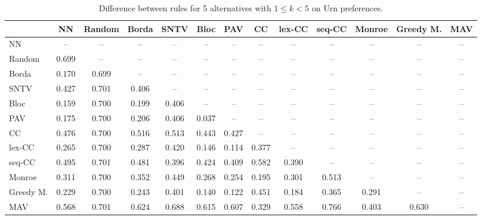 
\begin{table*}[htbp]
\centering
\begin{tabular}{lcccccccccccc}
\toprule
 & NN & Random & Borda & SNTV & Bloc & PAV & CC & lex-CC & seq-CC & Monroe & Greedy M. & MAV \\
\midrule
NN & -- & -- & -- & -- & -- & -- & -- & -- & -- & -- & -- & -- \\
Random & \cellcolor{blue!69} 0.699 & -- & -- & -- & -- & -- & -- & -- & -- & -- & -- & -- \\
Borda & \cellcolor{blue!17} 0.170 & \cellcolor{blue!69} 0.699 & -- & -- & -- & -- & -- & -- & -- & -- & -- & -- \\
SNTV & \cellcolor{blue!42} 0.427 & \cellcolor{blue!70} 0.701 & \cellcolor{blue!40} 0.406 & -- & -- & -- & -- & -- & -- & -- & -- & -- \\
Bloc & \cellcolor{blue!15} 0.159 & \cellcolor{blue!70} 0.700 & \cellcolor{blue!19} 0.199 & \cellcolor{blue!40} 0.406 & -- & -- & -- & -- & -- & -- & -- & -- \\
PAV & \cellcolor{blue!17} 0.175 & \cellcolor{blue!70} 0.700 & \cellcolor{blue!20} 0.206 & \cellcolor{blue!40} 0.406 & \cellcolor{blue!3} 0.037 & -- & -- & -- & -- & -- & -- & -- \\
CC & \cellcolor{blue!47} 0.476 & \cellcolor{blue!70} 0.700 & \cellcolor{blue!51} 0.516 & \cellcolor{blue!51} 0.513 & \cellcolor{blue!44} 0.443 & \cellcolor{blue!42} 0.427 & -- & -- & -- & -- & -- & -- \\
lex-CC & \cellcolor{blue!26} 0.265 & \cellcolor{blue!70} 0.700 & \cellcolor{blue!28} 0.287 & \cellcolor{blue!42} 0.420 & \cellcolor{blue!14} 0.146 & \cellcolor{blue!11} 0.114 & \cellcolor{blue!37} 0.377 & -- & -- & -- & -- & -- \\
seq-CC & \cellcolor{blue!49} 0.495 & \cellcolor{blue!70} 0.701 & \cellcolor{blue!48} 0.481 & \cellcolor{blue!39} 0.396 & \cellcolor{blue!42} 0.424 & \cellcolor{blue!40} 0.409 & \cellcolor{blue!58} 0.582 & \cellcolor{blue!39} 0.390 & -- & -- & -- & -- \\
Monroe & \cellcolor{blue!31} 0.311 & \cellcolor{blue!70} 0.700 & \cellcolor{blue!35} 0.352 & \cellcolor{blue!44} 0.449 & \cellcolor{blue!26} 0.268 & \cellcolor{blue!25} 0.254 & \cellcolor{blue!19} 0.195 & \cellcolor{blue!30} 0.301 & \cellcolor{blue!51} 0.513 & -- & -- & -- \\
Greedy M. & \cellcolor{blue!22} 0.229 & \cellcolor{blue!70} 0.700 & \cellcolor{blue!24} 0.243 & \cellcolor{blue!40} 0.401 & \cellcolor{blue!14} 0.140 & \cellcolor{blue!12} 0.122 & \cellcolor{blue!45} 0.451 & \cellcolor{blue!18} 0.184 & \cellcolor{blue!36} 0.365 & \cellcolor{blue!29} 0.291 & -- & -- \\
MAV & \cellcolor{blue!56} 0.568 & \cellcolor{blue!70} 0.701 & \cellcolor{blue!62} 0.624 & \cellcolor{blue!68} 0.688 & \cellcolor{blue!61} 0.615 & \cellcolor{blue!60} 0.607 & \cellcolor{blue!32} 0.329 & \cellcolor{blue!55} 0.558 & \cellcolor{blue!76} 0.766 & \cellcolor{blue!40} 0.403 & \cellcolor{blue!63} 0.630 & -- \\
\bottomrule
\end{tabular}

\caption{Difference between rules for 5 alternatives with $1 \leq k < 5$ on Urn preferences.}
\label{tab:rule_distance_heatmap-m=[5]-pref_dist=URN-R}
\end{table*}
    